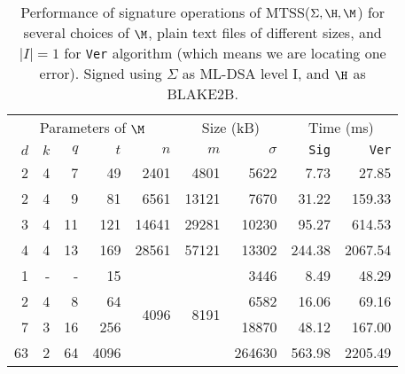 \begin{table*}[htbp]
    \setlength{\tabcolsep}{10pt}
    \centering
    \caption{Performance of signature operations of MTSS($\Sigma, \H, \M$) for several choices of $\M$,
        plain text files of different sizes, and $|I| = 1$ for \texttt{Ver} algorithm (which means we are locating one error).
        Signed using $\Sigma$ as ML-DSA level I, and $\H$ as BLAKE2B.}
    \begin{tabular}{rrrrrrrrr}
        \toprule
        \multicolumn{5}{c}{Parameters of $\M$} & \multicolumn{2}{c}{Size  (kB)} & \multicolumn{2}{c}{Time (ms)}
        \\
        \cmidrule(lr){1-5} \cmidrule(lr){6-7} \cmidrule(lr){8-9}
        $d$ & $k$ & $q$ & $t$  & $n$                   & $m$                   & $\sigma$ & \texttt{Sig} & \texttt{Ver} \\
        \midrule
        2   & 4   & 7   & 49   & 2401                  & 4801                  & 5622     & 7.73         & 27.85        \\
        2   & 4   & 9   & 81   & 6561                  & 13121                 & 7670     & 31.22        & 159.33       \\
        3   & 4   & 11  & 121  & 14641                 & 29281                 & 10230    & 95.27        & 614.53       \\
        4   & 4   & 13  & 169  & 28561                 & 57121                 & 13302    & 244.38       & 2067.54      \\
        \midrule

        1   & -   & -   & 15   & \multirow{4}{*}{4096} & \multirow{4}{*}{8191} & 3446     & 8.49         & 48.29        \\
        2   & 4   & 8   & 64   &                       &                       & 6582     & 16.06        & 69.16        \\
        7   & 3   & 16  & 256  &                       &                       & 18870    & 48.12        & 167.00       \\
        63  & 2   & 64  & 4096 &                       &                       & 264630   & 563.98       & 2205.49      \\

        \bottomrule
    \end{tabular}
    \label{table:sign-locate-different-parameters}
\end{table*}
